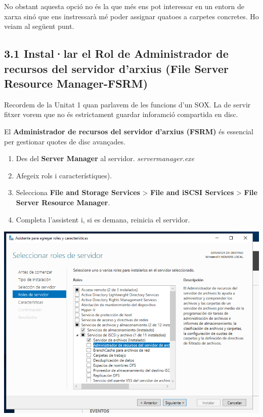 \documentclass[
  a4paper,
]{article}
\providecommand{\tightlist}{%
  \setlength{\itemsep}{0pt}\setlength{\parskip}{0pt}}
\begin{document}
No obstant aquesta opció no és la que més ens pot interessar en un
entorn de xarxa sinó que ens instressarà mé poder assignar quatoes a
carpetes concretes. Ho veiam al següent punt.

\subsection{3.1 Instal·lar el Rol de Administrador de recursos del
servidor d'arxius (File Server Resource
Manager-FSRM)}\label{installar-el-rol-de-administrador-de-recursos-del-servidor-darxius-file-server-resource-manager-fsrm}

Recordem de la Unitat 1 quan parlavem de les funcions d'un SOX. La de
servir fitxer vorem que no és estrictament guardar inforamció compartida
en disc.

El \textbf{Administrador de recursos del servidor d'arxius (FSRM)} és
essencial per gestionar quotes de disc avançades.

\begin{enumerate}
\def\labelenumi{\arabic{enumi}.}
\tightlist
\item
  Des del \textbf{Server Manager} al servidor. \emph{servermanager.exe}
\item
  Afegeix rols i característiques).
\item
  Selecciona \textbf{File and Storage Services} \textgreater{}
  \textbf{File and iSCSI Services} \textgreater{} \textbf{File Server
  Resource Manager}.
\item
  Completa l'assistent i, si es demana, reinicia el servidor.
\end{enumerate}

\includegraphics{png/Cuotas1.png}
\end{document}
